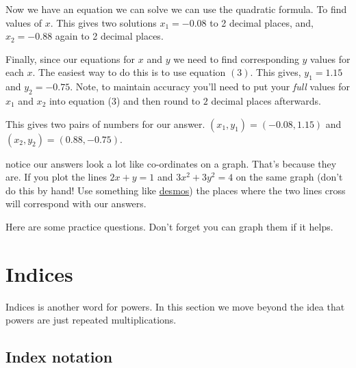 \documentclass[
  a4paper,
]{scrbook}
\begin{document}
Now we have an equation we can solve we can use the quadratic formula.
To find values of \(x\). This gives two solutions \(x_1 = -0.08\) to 2
decimal places, and, \(x_2 = -0.88\) again to 2 decimal places.

Finally, since our equations for \(x\) and \(y\) we need to find
corresponding \(y\) values for each \(x\). The easiest way to do this is
to use equation \((3)\). This gives, \(y_1 =1.15\) and \(y_2 = -0.75\).
Note, to maintain accuracy you'll need to put your \emph{full} values
for \(x_1\) and \(x_2\) into equation (3) and then round to \(2\)
decimal places afterwards.

This gives two pairs of numbers for our answer.
\((x_1,y_1) = (-0.08,1.15)\) and \((x_2,y_2)=(0.88,-0.75)\).

\begin{tcolorbox}[enhanced jigsaw, arc=.35mm, bottomrule=.15mm, bottomtitle=1mm, breakable, colback=white, colbacktitle=quarto-callout-tip-color!10!white, colframe=quarto-callout-tip-color-frame, coltitle=black, left=2mm, leftrule=.75mm, opacityback=0, opacitybacktitle=0.6, rightrule=.15mm, title=\textcolor{quarto-callout-tip-color}{\faLightbulb}\hspace{0.5em}{Pro tip}, titlerule=0mm, toprule=.15mm, toptitle=1mm]

notice our answers look a lot like co-ordinates on a graph. That's
because they are. If you plot the lines \(2x+y = 1\) and
\(3x^2+3y^2 = 4\) on the same graph (don't do this by hand! Use
something like \href{https://www.desmos.com/calculator}{desmos}) the
places where the two lines cross will correspond with our answers.

\end{tcolorbox}

Here are some practice questions. Don't forget you can graph them if it
helps.


\chapter{Indices}\label{indices}

Indices is another word for powers. In this section we move beyond the
idea that powers are just repeated multiplications.

\section{Index notation}\label{index-notation}
\end{document}
